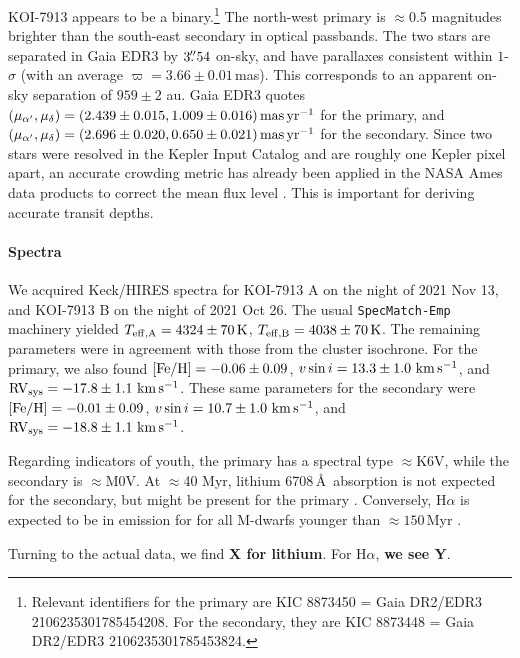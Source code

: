 \documentclass[12pt,twocolumn,linenumbers]{aastex63}
\newcommand{\mkms}{{\rm \,km\,s^{-1}}}  %
\begin{document}
KOI-7913 appears to be a binary.\footnote{Relevant identifiers for the
primary are KIC 8873450 = Gaia DR2/EDR3 2106235301785454208.  For the
secondary, they are KIC 8873448 = Gaia DR2/EDR3 2106235301785453824.}
The north-west primary is $\approx$0.5 magnitudes brighter than the
south-east secondary in optical passbands.  The two stars are
separated in Gaia EDR3 by $3\mbox{$.\!\!^{\prime\prime}$}54$ on-sky, and have parallaxes
consistent within $1$-$\sigma$ (with an average $\varpi=3.66 \pm
0.01$\,mas).  This corresponds to an apparent on-sky separation of
$959 \pm 2$ au.  Gaia EDR3 quotes
$(\mu_{\alpha'},\mu_\delta)=(2.439\pm0.015, 1.009\pm 0.016)\,{\rm
mas}\,{\rm yr}^{-1}$ for the primary, and
$(\mu_{\alpha'},\mu_\delta)=(2.696\pm0.020, 0.650 \pm 0.021) \,{\rm
mas}\,{\rm yr}^{-1}$ for the secondary.  Since two stars were resolved
in the Kepler Input Catalog and are roughly one Kepler pixel apart, an
accurate crowding metric has already been applied in the NASA Ames
data products to correct the mean flux level
\citep{2017ksci.rept....6M}.  This is important for deriving accurate
transit depths.

\paragraph{Spectra}

We acquired Keck/HIRES spectra for KOI-7913 A on the night of 2021 Nov
13, and KOI-7913 B on the night of 2021 Oct 26.  The usual
\texttt{SpecMatch-Emp} \citep{yee_SM_2017} machinery yielded $T_{\rm
eff,A} = 4324 \pm 70\,{\rm K}$, $T_{\rm eff,B} = 4038 \pm 70\,{\rm
K}$.  The remaining parameters were in agreement with those from the
cluster isochrone.  For the primary, we also found $[{\rm Fe/H}]=
-0.06 \pm 0.09$, $v\sin i = 13.3 \pm 1.0\,\mkms$, and ${\rm RV}_{\rm
sys} = -17.8 \pm 1.1\,\mkms$.  These same parameters for the secondary
were $[{\rm Fe/H}]= -0.01 \pm 0.09$, $v\sin i = 10.7 \pm 1.0\,\mkms$,
and ${\rm RV}_{\rm sys} = -18.8 \pm 1.1\,\mkms$.

Regarding indicators of youth, the primary has a spectral type
$\approx$K6V, while the secondary is $\approx$M0V.  At $\approx$40
Myr, lithium 6708\,\AA\ absorption is not expected for the secondary,
but might be present for the primary \citep[{\it
e.g.},][Figure~8]{soderblom_ages_2014}.  Conversely, H$\alpha$ is
expected to be in emission for for all M-dwarfs younger than
$\approx150$\,Myr \citep{kiman_calibration_2021}.

Turning to the actual data, we find {\bf X for lithium}.
For H$\alpha$, {\bf we see Y}.
\end{document}
